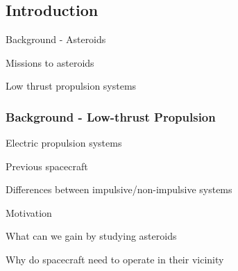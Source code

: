 
\section*{}
\subsection*{Introduction}  

\begin{frame}{Background - Asteroids} %

Missions to asteroids


Low thrust propulsion systems


\end{frame}   %

\begin{frame}[t]\frametitle{Background - Low-thrust Propulsion}
    Electric propulsion systems

    Previous spacecraft 

    Differences between impulsive/non-impulsive systems
\end{frame}

\begin{frame}[t]{Motivation}
    
What can we gain by studying asteroids

Why do spacecraft need to operate in their vicinity


\end{frame}

